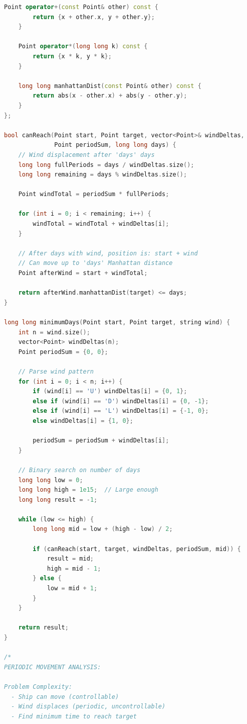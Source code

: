 \documentclass[11pt,a4paper,oneside]{book}
\begin{document}
\begin{lstlisting}[language=C++, caption=Distance Optimization - DETAILED SOLUTIONS]
    Point operator+(const Point& other) const {
        return {x + other.x, y + other.y};
    }
    
    Point operator*(long long k) const {
        return {x * k, y * k};
    }
    
    long long manhattanDist(const Point& other) const {
        return abs(x - other.x) + abs(y - other.y);
    }
};

bool canReach(Point start, Point target, vector<Point>& windDeltas, 
              Point periodSum, long long days) {
    // Wind displacement after 'days' days
    long long fullPeriods = days / windDeltas.size();
    long long remaining = days % windDeltas.size();
    
    Point windTotal = periodSum * fullPeriods;
    
    for (int i = 0; i < remaining; i++) {
        windTotal = windTotal + windDeltas[i];
    }
    
    // After days with wind, position is: start + wind
    // Can move up to 'days' Manhattan distance
    Point afterWind = start + windTotal;
    
    return afterWind.manhattanDist(target) <= days;
}

long long minimumDays(Point start, Point target, string wind) {
    int n = wind.size();
    vector<Point> windDeltas(n);
    Point periodSum = {0, 0};
    
    // Parse wind pattern
    for (int i = 0; i < n; i++) {
        if (wind[i] == 'U') windDeltas[i] = {0, 1};
        else if (wind[i] == 'D') windDeltas[i] = {0, -1};
        else if (wind[i] == 'L') windDeltas[i] = {-1, 0};
        else windDeltas[i] = {1, 0};
        
        periodSum = periodSum + windDeltas[i];
    }
    
    // Binary search on number of days
    long long low = 0;
    long long high = 1e15;  // Large enough
    long long result = -1;
    
    while (low <= high) {
        long long mid = low + (high - low) / 2;
        
        if (canReach(start, target, windDeltas, periodSum, mid)) {
            result = mid;
            high = mid - 1;
        } else {
            low = mid + 1;
        }
    }
    
    return result;
}

/*
PERIODIC MOVEMENT ANALYSIS:

Problem Complexity:
  - Ship can move (controllable)
  - Wind displaces (periodic, uncontrollable)
  - Find minimum time to reach target


\end{lstlisting}
\end{document}
